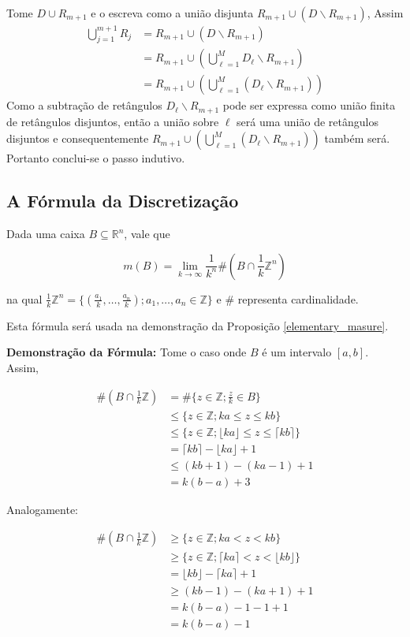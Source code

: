 \documentclass[12pt,letterpaper]{article}
\newcommand{\rn}{\mathbb{R}^n}
\begin{document}
\begin{appendices}
			Tome $D\cup R_{m+1}$ e o escreva como a união disjunta $R_{m+1}\cup(D\backslash R_{m+1})$, Assim
			\begin{align*}
				\bigcup_{j=1}^{m+1}R_j&=R_{m+1}\cup(D\backslash R_{m+1})\\
				&=R_{m+1}\cup\left(\bigcup_{\ell=1}^{M} D_{\ell}\backslash R_{m+1}\right)\\
				&=R_{m+1}\cup\left(\bigcup_{\ell=1}^{M} (D_{\ell}\backslash R_{m+1})\right)
			\end{align*}
		Como a subtração de retângulos $D_{\ell}\backslash R_{m+1}$ pode ser expressa como união finita de retângulos disjuntos, então a união sobre $\ell$ será uma união de retângulos disjuntos e consequentemente $R_{m+1}\cup\left(\bigcup_{\ell=1}^{M} (D_{\ell}\backslash R_{m+1})\right)$ também será. Portanto conclui-se o passo indutivo.
		
		\subsection{A Fórmula da Discretização}
			Dada uma caixa $B\subseteq \rn$, vale que 
			
			$$m(B)=\lim_{k\to\infty}\dfrac{1}{k^n}\#(B\cap\frac1k\mathbb{Z}^n)$$
			
			na qual $\frac1k\mathbb{Z}^n=\{(\frac{a_1}k,\ldots,\frac{a_n}k);a_1,\ldots,a_n\in\mathbb{Z}\}$ e $\#$ representa cardinalidade.
			
			Esta fórmula será usada na demonstração da Proposição \ref{elementary_masure}.
			
			\textbf{Demonstração da Fórmula:} Tome o caso onde $B$ é um intervalo $[a,b]$. Assim,
			
			\begin{align*}
				\#(B\cap\frac1k\mathbb{Z})&=\#\{z\in\mathbb{Z};\frac z k\in B\}\\
				&\leq\{z\in\mathbb{Z};ka\leq z \leq kb\}\\
				&\leq \{z\in\mathbb{Z};\lfloor ka \rfloor\leq z \leq \lceil kb \rceil\}\\
				&= \lceil kb \rceil-\lfloor ka \rfloor+1\\
				&\leq (kb+1)-(ka-1)+1\\
				&=k(b-a)+3
			\end{align*}
		
		Analogamente:
		
		\begin{align*}
				\#(B\cap\frac1k\mathbb{Z})&\geq\{z\in\mathbb{Z};ka< z < kb\}\\
				&\geq\{z\in\mathbb{Z};\lceil ka\rceil < z < \lfloor kb\rfloor\}\\
				&=\lfloor kb\rfloor-\lceil ka\rceil+1\\
				&\geq(kb-1)-(ka+1)+1\\
				&=k(b-a)-1-1+1\\
				&=k(b-a)-1
		\end{align*}
		

\end{appendices}
\end{document}
